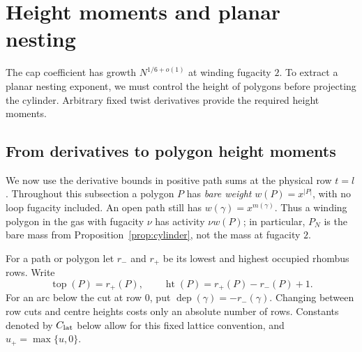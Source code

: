 \section{Height moments and planar nesting}\label{sec:projection}

The cap coefficient has growth $N^{1/6+o(1)}$ at winding fugacity $2$.
To extract a planar nesting exponent, we must control the height of
polygons before projecting the cylinder. Arbitrary fixed twist derivatives
provide the required height moments.



\subsection{From derivatives to polygon height moments}

We now use the derivative bounds in positive path sums at the physical row
$t=l$. Throughout this subsection a polygon $P$ has \emph{bare weight}
$w(P)=x^{|P|}$, with no loop fugacity included. An open path still has
$w(\gamma)=x^{m(\gamma)}$. Thus a winding polygon in the gas with fugacity
$\nu$ has activity $\nu w(P)$; in particular, $P_N$ is the bare mass from
Proposition~\ref{prop:cylinder}, not the mass at fugacity $2$.

For a path or polygon let $r_-$ and $r_+$ be its lowest and highest
occupied rhombus rows. Write
\[
 \operatorname{top}(P)=r_+(P),\qquad
 \operatorname{ht}(P)=r_+(P)-r_-(P)+1.
\]
For an arc below the cut at row $0$, put
$\operatorname{dep}(\gamma)=-r_-(\gamma)$. Changing between row cuts and
centre heights costs only an absolute number of rows. Constants denoted
by $C_{\rm lat}$ below allow for this fixed lattice convention, and
$u_+=\max\{u,0\}$.

